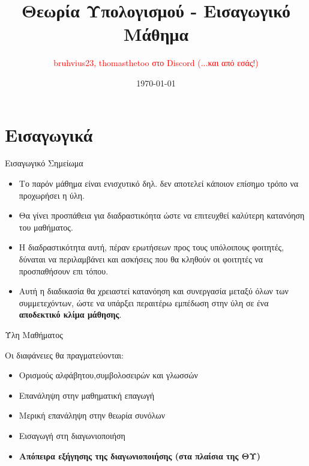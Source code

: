 \documentclass[size=14pt, paper=smartboard, style=fyma, mode=present]{powerdot}
\title{Θεωρία Υπολογισμού - Εισαγωγικό Μάθημα}
\author{\textcolor{red}{\textlatin{bruhvius23}, \textlatin{thomasthetoo} στο \textlatin{Discord}  (...και από εσάς!)}}
\date{\today}
\begin{document}
\maketitle
\section[tocsection=true, slide=false]{Εισαγωγικά}
\begin{slide}[]{{Εισαγωγικό Σημείωμα}}
{\large 	
  \begin{itemize}
  	\item Το παρόν μάθημα είναι ενισχυτικό δηλ. δεν αποτελεί κάποιον επίσημο τρόπο να προχωρήσει η ύλη. 
  	\item Θα γίνει προσπάθεια για διαδραστικόητα ώστε να επιτευχθεί καλύτερη κατανόηση του μαθήματος.
  	\item Η διαδραστικότητα αυτή, πέραν ερωτήσεων προς τους υπόλοιπους φοιτητές, δύναται να περιλαμβάνει και ασκήσεις που θα κληθούν οι φοιτητές να προσπαθήσουν επι τόπου.
  	\item Αυτή η διαδικασία θα χρειαστεί κατανόηση και συνεργασία μεταξύ όλων των συμμετεχόντων, ώστε να υπάρξει περαιτέρω εμπέδωση στην ύλη σε ένα \textbf{αποδεκτικό κλίμα μάθησης}.
  \end{itemize}
  }
\end{slide}


\begin{slide}[]{Ύλη Μαθήματος}
{\Large   Οι διαφάνειες θα πραγματεύονται:
  \begin{itemize}
  	\item Ορισμούς αλφάβητου,συμβολοσειρών και γλωσσών
  	\item Επανάληψη στην μαθηματική επαγωγή
  	\item Μερική επανάληψη στην θεωρία συνόλων
  	\item Εισαγωγή στη διαγωνιοποιήση
  	\pause
  	\item \textbf{Απόπειρα εξήγησης της διαγωνιοποιήσης (στα πλαίσια της ΘΥ)} %
  \end{itemize}
  }
\end{slide}
\end{document}
